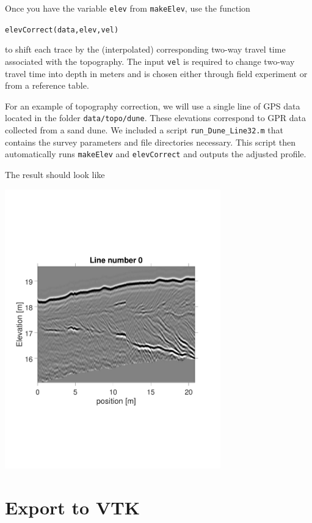 \documentclass[11pt]{article}
\begin{document}
Once you have the variable \verb#elev# from \verb#makeElev#, use the function

\qquad \verb#elevCorrect(data,elev,vel)#

to shift each trace by the (interpolated) corresponding two-way travel
time associated with the topography. The input \verb#vel# is required to change two-way travel time 
into depth in meters and is chosen either through field experiment or from a reference table.

For an example of topography correction, we will use a single line of GPS data 
located in the folder \verb#data/topo/dune#. These elevations correspond to GPR data
collected from a sand dune. We included a script \verb#run_Dune_Line32.m# that
contains the survey parameters and file directories necessary. This script then 
automatically runs \verb#makeElev# and \verb#elevCorrect# and outputs the adjusted
profile.


The result should look like

\begin{center}
\includegraphics[width=0.7\textwidth, trim = 0.9cm 6cm 2cm
  6.5cm,clip]{figures/TopoCorrection}
\end{center}



\section{Export to VTK}
\end{document}
